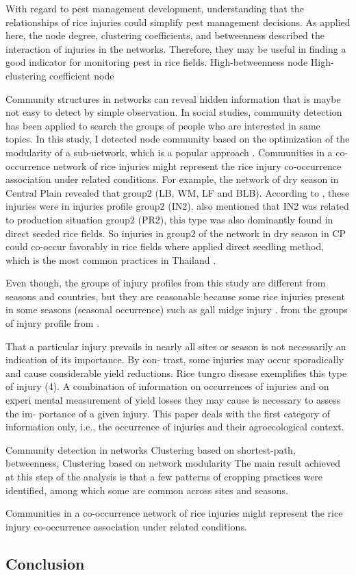 With regard to pest management development, understanding that the relationships of rice injuries could simplify pest management decisions. As applied here, the node degree, clustering coefficients, and betweenness described the interaction of injuries in the networks. Therefore, they may be useful in finding a good indicator for monitoring pest in rice fields. High-betweenness node High- clustering coefficient node 

Community structures in networks can reveal hidden information that is maybe not easy to detect by simple observation. In social studies, community detection has been applied to search the groups of people who are interested in same topics.   In this study, I detected node community based on the optimization of the modularity of a sub-network, which is a popular approach \cite{Liu_2014_Detecting}. Communities in a co-occurrence network of rice injuries might represent the rice injury co-occurrence association under related conditions. For example, the network of dry season in Central Plain revealed that group2 (LB, WM, LF and BLB).  According to \citet{Savary_2000_Characterization}, these injuries were in injuries profile group2 (IN2). \citet{Savary_2000_Characterization} also mentioned that IN2 was related to production situation group2 (PR2), this type was also dominantly found in direct seeded rice fields. So injuries in group2 of the network in dry season in CP could co-occur favorably in rice fields where applied direct seedling method, which is the most common practices in Thailand \citep{IRRI_2013_Rice}. 


Even though, the groups of injury profiles from this study are different from seasons and countries, but they are reasonable because some rice injuries present in some seasons (seasonal occurrence) such as gall midge injury \cite{Krishnaiah_2004_Rice}. from the groups of injury profile from \citep{Savary_2000_Characterization}. 


That a particular injury prevails in nearly all sites or season is not necessarily an indication of its importance. By con- trast, some injuries may occur sporadically and cause considerable yield reductions. Rice tungro disease exemplifies this type of injury (4). A combination of information on occurrences of injuries and on experi mental measurement of yield losses they may cause is necessary to assess the im- portance of a given injury. This paper deals with the first category of information only, i.e., the occurrence of injuries and their agroecological context.


Community detection in networks  Clustering based on shortest-path, betweenness, Clustering based on network modularity
The main result achieved at this step of the analysis is that a few patterns of cropping practices were identified, among which some are common across sites and seasons.

Communities in a co-occurrence network of rice injuries might represent the rice injury co-occurrence association under related conditions.

\subsection{Conclusion}


